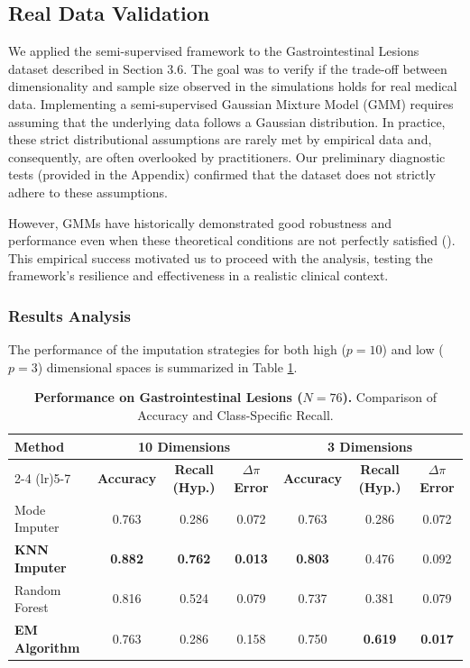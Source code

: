 \documentclass[11pt, a4paper]{article}
\begin{document}
\subsection{Real Data Validation}

We applied the semi-supervised framework to the Gastrointestinal Lesions dataset described in Section 3.6. The goal was to verify if the trade-off between dimensionality and sample size observed in the simulations holds for real medical data. 
Implementing a semi-supervised Gaussian Mixture Model (GMM) requires assuming that the underlying data follows a Gaussian distribution. In practice, these strict distributional 
assumptions are rarely met by empirical data and, consequently, are often overlooked by 
practitioners. Our preliminary diagnostic tests (provided in the Appendix) confirmed that 
the dataset does not strictly adhere to these assumptions.

However, GMMs have historically demonstrated good robustness and  
performance even when these theoretical conditions are not perfectly satisfied (\cite{Setiadi2024, sampaio2024regularizationoptimizationmodelbasedclustering, Liu2022GMMchi}). 
This empirical success motivated us to proceed with the analysis, testing the 
framework’s resilience and effectiveness in a realistic clinical context.

\subsubsection{Results Analysis}
The performance of the imputation strategies for both high ($p=10$) and low ($p=3$) dimensional spaces is summarized in Table \ref{tab:real_data_results}.

\begin{table}[h!]
    \centering
    \small
    \caption{\textbf{Performance on Gastrointestinal Lesions ($N=76$).} Comparison of Accuracy and Class-Specific Recall.}
    \label{tab:real_data_results}
    \begin{tabular}{lcccccc}
        \toprule
        \multirow{2.5}{*}{\textbf{Method}} & \multicolumn{3}{c}{\textbf{10 Dimensions}} & \multicolumn{3}{c}{\textbf{3 Dimensions}} \\
        \cmidrule(lr){2-4} \cmidrule(lr){5-7}
         & \textbf{Accuracy} & \textbf{Recall (Hyp.)} & \textbf{$\Delta \pi$ Error} & \textbf{Accuracy} & \textbf{Recall (Hyp.)} & \textbf{$\Delta \pi$ Error} \\
        \midrule
        Mode Imputer & 0.763 & 0.286 & 0.072 & 0.763 & 0.286 & 0.072 \\
        \textbf{KNN Imputer} & \textbf{0.882} & \textbf{0.762} & \textbf{0.013} & \textbf{0.803} & 0.476 & 0.092 \\
        Random Forest & 0.816 & 0.524 & 0.079 & 0.737 & 0.381 & 0.079 \\
        \textbf{EM Algorithm} & 0.763 & 0.286 & 0.158 & 0.750 & \textbf{0.619} & \textbf{0.017} \\
        \bottomrule
    \end{tabular}
\end{table}
\end{document}

